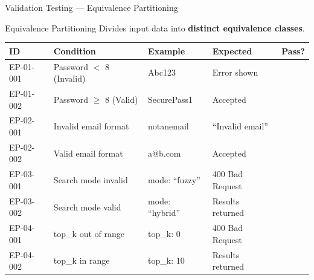 \documentclass[aspectratio=169,xcolor=dvipsnames]{beamer}
\newcommand{\cmark}{\checkmark}
\newcommand{\tw}{\textwidth}
\begin{document}
\begin{frame}{Validation Testing — Equivalence Partitioning}
  \begin{block}{Equivalence Partitioning}
    \scriptsize Divides input data into \textbf{distinct equivalence classes}.
  \end{block}
  \tiny\renewcommand{\arraystretch}{0.90}
  \begin{table}
    \centering
    \setlength{\tabcolsep}{2pt}
    \begin{tabular}{p{.09\tw}|p{.26\tw}|p{.20\tw}|p{.30\tw}|p{.08\tw}}
      \toprule
      \textbf{ID} & \textbf{Condition} & \textbf{Example} & \textbf{Expected} & \textbf{Pass?}\\
      \midrule
      EP-01-001 & Password $<$ 8 (Invalid) & Abc123 & Error shown & \textcolor{green!60!black}{\cmark}\\
      EP-01-002 & Password $\geq$ 8 (Valid) & SecurePass1 & Accepted & \textcolor{green!60!black}{\cmark}\\
      \midrule
      EP-02-001 & Invalid email format & notanemail & ``Invalid email'' & \textcolor{green!60!black}{\cmark}\\
      EP-02-002 & Valid email format & a@b.com & Accepted & \textcolor{green!60!black}{\cmark}\\
      \midrule
      EP-03-001 & Search mode invalid & mode: ``fuzzy'' & 400 Bad Request & \textcolor{green!60!black}{\cmark}\\
      EP-03-002 & Search mode valid & mode: ``hybrid'' & Results returned & \textcolor{green!60!black}{\cmark}\\
      \midrule
      EP-04-001 & top\_k out of range & top\_k: 0 & 400 Bad Request & \textcolor{green!60!black}{\cmark}\\
      EP-04-002 & top\_k in range & top\_k: 10 & Results returned & \textcolor{green!60!black}{\cmark}\\
      \bottomrule
    \end{tabular}
  \end{table}
\end{frame}
\end{document}
